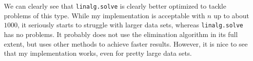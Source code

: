 \documentclass[]{article}
\begin{document}
We can clearly see that \texttt{linalg.solve} is clearly better optimized to tackle problems of this type. While my implementation is acceptable with $n$ up to about $1000$, it seriously starts to struggle with larger data sets, whereas \texttt{linalg.solve} has no problems. It probably does not use the elimination algorithm in its full extent, but uses other methods to achieve faster results. However, it is nice to see that my implementation works, even for pretty large data sets.
\end{document}

